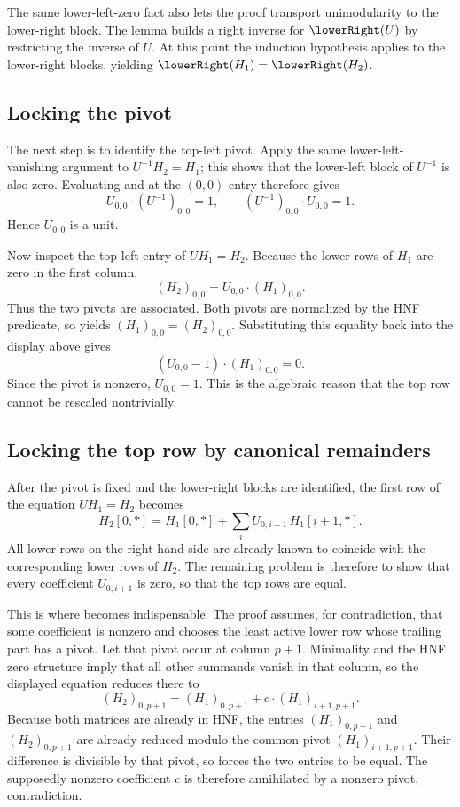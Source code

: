 The same lower-left-zero fact also lets the proof transport unimodularity to the
lower-right block. The lemma 
builds a right inverse for \(\lowerRight(U)\) by restricting the inverse of
\(U\). At this point the induction hypothesis applies to the lower-right blocks,
yielding \(\lowerRight(H_1) = \lowerRight(H_2)\).

\subsection{Locking the pivot}

The next step is to identify the top-left pivot. Apply the same
lower-left-vanishing argument to \(U^{-1} H_2 = H_1\); this shows that the
lower-left block of \(U^{-1}\) is also zero. Evaluating
 and
 at the \((0,0)\) entry therefore gives
\[
  U_{0,0} \cdot (U^{-1})_{0,0} = 1,
  \qquad
  (U^{-1})_{0,0} \cdot U_{0,0} = 1.
\]
Hence \(U_{0,0}\) is a unit.

Now inspect the top-left entry of \(U H_1 = H_2\). Because the lower rows of
\(H_1\) are zero in the first column,
\[
  (H_2)_{0,0} = U_{0,0} \cdot (H_1)_{0,0}.
\]
Thus the two pivots are associated. Both pivots are normalized by the HNF
predicate, so  yields
\((H_1)_{0,0} = (H_2)_{0,0}\). Substituting this equality back into the display
above gives
\[
  (U_{0,0} - 1) \cdot (H_1)_{0,0} = 0.
\]
Since the pivot is nonzero, \(U_{0,0} = 1\). This is the algebraic reason that
the top row cannot be rescaled nontrivially.

\subsection{Locking the top row by canonical remainders}

After the pivot is fixed and the lower-right blocks are identified, the first row
of the equation \(U H_1 = H_2\) becomes
\[
  H_2[0,\ast] = H_1[0,\ast] + \sum_i U_{0,i+1} \, H_1[i+1,\ast].
\]
All lower rows on the right-hand side are already known to coincide with the
corresponding lower rows of \(H_2\). The remaining problem is therefore to show
that every coefficient \(U_{0,i+1}\) is zero, so that the top rows are equal.

This is where  becomes indispensable. The proof
 assumes, for contradiction, that some
coefficient is nonzero and chooses the least active lower row whose trailing part
has a pivot. Let that pivot occur at column \(p+1\). Minimality and the HNF zero
structure imply that all other summands vanish in that column, so the displayed
equation reduces there to
\[
  (H_2)_{0,p+1} = (H_1)_{0,p+1} + c \cdot (H_1)_{i+1,p+1}.
\]
Because both matrices are already in HNF, the entries
\((H_1)_{0,p+1}\) and \((H_2)_{0,p+1}\) are already reduced modulo the common
pivot \((H_1)_{i+1,p+1}\). Their difference is divisible by that pivot, so
 forces the two entries to be equal.
The supposedly nonzero coefficient \(c\) is therefore annihilated by a nonzero
pivot, contradiction.

